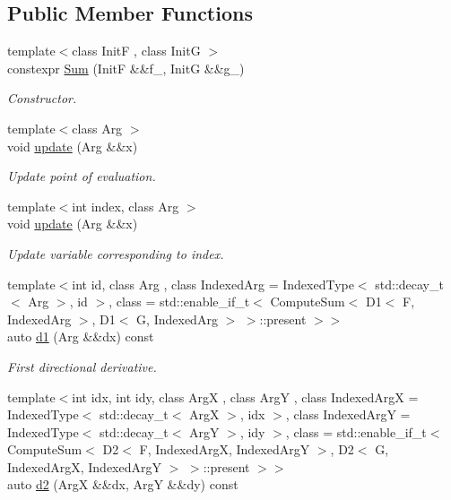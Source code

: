 \subsection*{Public Member Functions}
\begin{DoxyCompactItemize}
\item 
{\footnotesize template$<$class Init\-F , class Init\-G $>$ }\\constexpr \hyperlink{structfuncy_1_1MathematicalOperations_1_1Sum_a7c23d59f7a9ca7ef1584195b437c6c71}{Sum} (Init\-F \&\&f\-\_\-, Init\-G \&\&g\-\_\-)
\begin{DoxyCompactList}\small\item\em Constructor. \end{DoxyCompactList}\item 
{\footnotesize template$<$class Arg $>$ }\\void \hyperlink{structfuncy_1_1MathematicalOperations_1_1Sum_ab70dc2a344084335778658e5aa27c6b9}{update} (Arg \&\&x)
\begin{DoxyCompactList}\small\item\em Update point of evaluation. \end{DoxyCompactList}\item 
{\footnotesize template$<$int index, class Arg $>$ }\\void \hyperlink{structfuncy_1_1MathematicalOperations_1_1Sum_a8d03c52542a8fc305d8c2de20ed95209}{update} (Arg \&\&x)
\begin{DoxyCompactList}\small\item\em Update variable corresponding to index. \end{DoxyCompactList}\item 
{\footnotesize template$<$int id, class Arg , class Indexed\-Arg  = Indexed\-Type$<$ std\-::decay\-\_\-t$<$ Arg $>$, id $>$, class  = std\-::enable\-\_\-if\-\_\-t$<$                           Compute\-Sum$<$ D1$<$ F, Indexed\-Arg $>$, D1$<$ G, Indexed\-Arg $>$ $>$\-::present $>$$>$ }\\auto \hyperlink{structfuncy_1_1MathematicalOperations_1_1Sum_a2b3adf33f0a36f8328efe7e332a1ad6d}{d1} (Arg \&\&dx) const 
\begin{DoxyCompactList}\small\item\em First directional derivative. \end{DoxyCompactList}\item 
{\footnotesize template$<$int idx, int idy, class Arg\-X , class Arg\-Y , class Indexed\-Arg\-X  = Indexed\-Type$<$ std\-::decay\-\_\-t$<$ Arg\-X $>$, idx $>$, class Indexed\-Arg\-Y  = Indexed\-Type$<$ std\-::decay\-\_\-t$<$ Arg\-Y $>$, idy $>$, class  = std\-::enable\-\_\-if\-\_\-t$<$                           Compute\-Sum$<$ D2$<$ F, Indexed\-Arg\-X, Indexed\-Arg\-Y $>$,                                       D2$<$ G, Indexed\-Arg\-X, Indexed\-Arg\-Y $>$ $>$\-::present $>$$>$ }\\auto \hyperlink{structfuncy_1_1MathematicalOperations_1_1Sum_aacefe4f6840e2a8ec6da3e430901335e}{d2} (Arg\-X \&\&dx, Arg\-Y \&\&dy) const 

\end{DoxyCompactItemize}
